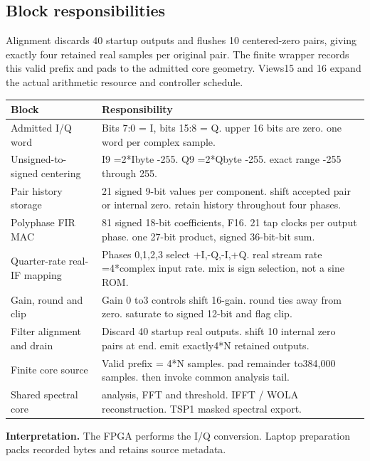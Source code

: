 \documentclass[11pt,letterpaper]{article}
\begin{document}
\subsection*{Block responsibilities}
Alignment discards 40 startup outputs and flushes 10 centered-zero pairs, giving exactly four retained real samples per original pair. The finite wrapper records this valid prefix and pads to the admitted core geometry. Views15 and 16 expand the actual arithmetic resource and controller schedule.
\par\medskip\noindent
\begin{tabularx}{\linewidth}{@{}>{\raggedright\arraybackslash}p{1.65in}Y@{}}\toprule
\textbf{Block} & \textbf{Responsibility} \\ \midrule
Admitted I/Q word & Bits 7:0 = I, bits 15:8 = Q. upper 16 bits are zero. one word per complex sample. \\[5pt]
Unsigned-to-signed centering & I9 =2*Ibyte -255. Q9 =2*Qbyte -255. exact range -255 through 255. \\[5pt]
Pair history storage & 21 signed 9-bit values per component. shift accepted pair or internal zero. retain history throughout four phases. \\[5pt]
Polyphase FIR MAC & 81 signed 18-bit coefficients, F16. 21 tap clocks per output phase. one 27-bit product, signed 36-bit-bit sum. \\[5pt]
Quarter-rate real-IF mapping & Phases 0,1,2,3 select +I,-Q,-I,+Q. real stream rate =4*complex input rate. mix is sign selection, not a sine ROM. \\[5pt]
Gain, round and clip & Gain 0 to3 controls shift 16-gain. round ties away from zero. saturate to signed 12-bit and flag clip. \\[5pt]
Filter alignment and drain & Discard 40 startup real outputs. shift 10 internal zero pairs at end. emit exactly4*N retained outputs. \\[5pt]
Finite core source & Valid prefix = 4*N samples. pad remainder to384,000 samples. then invoke common analysis tail. \\[5pt]
Shared spectral core & analysis, FFT and threshold. IFFT / WOLA reconstruction. TSP1 masked spectral export. \\[5pt]
\bottomrule\end{tabularx}
\vspace{8pt}
\noindent\textbf{Interpretation.} The FPGA performs the I/Q conversion. Laptop preparation packs recorded bytes and retains source metadata.
\clearpage
\end{document}
